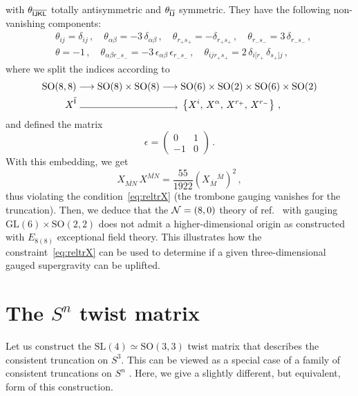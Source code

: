\documentclass[a4paper, 11pt]{article}
\numberwithin{equation}{section}
\newcommand{\ov}[1]{\overline{#1}}
\newcommand{\SL}[1]{\mathrm{SL}( #1 )}
\newcommand{\GL}[1]{\mathrm{GL}( #1 )}
\newcommand{\SO}[1]{\mathrm{SO}( #1 )}
\newcommand{\EE}{\ensuremath{E_{8(8)}}\xspace}
\newcommand{\+}{\oplus}
\newcommand{\fl}[1]{\ov{#1}}
\begin{document}
with $\theta_{\fl{\sf IJKL}}$ totally antisymmetric and $\theta_{\fl{\sf IJ}}$ symmetric. They have the following non-vanishing components:
\begin{align}
  & \theta_{ij}=\delta_{ij}\,,\quad \theta_{\alpha\beta}=-3\,\delta_{\alpha\beta}\,,\quad \theta_{r_{+}s_{+}}=-\delta_{r_{+}s_{+}}\,,\quad \theta_{r_{-}s_{-}}=3\,\delta_{r_{-}s_{-}}\,,\nonumber\\
  & \theta=-1\,,\quad \theta_{\alpha\beta r_{-}s_{-}} = -3\,\epsilon_{\alpha\beta}\,\epsilon_{r_{-}s_{-}}\,,\quad \theta_{ij r_{+}s_{+}} = 2\,\delta_{i[r_{+}}\,\delta_{s_{+}]j}\,,
\end{align}
where we split the indices according to
\begin{equation}
	\begin{aligned}
		\SO{8,8} & \longrightarrow \SO{8}\times\SO{8} \longrightarrow \SO{6}\times\SO{2}\times\SO{6}\times\SO{2} \\
		X^{\fl{\sf I}} & \ \tikz{\draw[arrows={->[scale=1.1]}] (0,0) -- (3.55
	,0);}\ \left\{X^{i},\,X^{\alpha},\,X^{r_{+}},\,X^{r_{-}}\right\}\,,
	\end{aligned}
\end{equation}
and defined the matrix
\begin{equation}
	 \epsilon = \begin{pmatrix}
                0 & 1\\
                -1 & 0
              \end{pmatrix}\,.
\end{equation}
With this embedding, we get
\begin{equation}
	X_{\ov{MN}}\,X^{\ov{MN}} = \frac{55}{1922}\left(X_{\ov M}{}^{\ov M}\right)^2\,,
\end{equation}
thus violating the condition~\eqref{eq:reltrX} (the trombone gauging vanishes for the truncation). Then, we deduce that the ${\cal N}=(8,0)$ theory of ref.~\cite{Deger:2019tem} with gauging $\GL{6} \times \SO{2,2}$ does not admit a higher-dimensional origin as constructed with \EE exceptional field theory. This illustrates how the constraint~\eqref{eq:reltrX} can be used to determine if a given three-dimensional gauged supergravity can be uplifted.

\section{The $S^n$ twist matrix} \label{s:SLn}
Let us construct the $\SL{4} \simeq \SO{3,3}$ twist matrix that describes the consistent truncation on $S^3$. This can be viewed as a special case of a family of consistent truncations on $S^n$ \cite{Lee:2014mla,Hohm:2014qga,Baguet:2015iou}. Here, we give a slightly different, but equivalent, form of this construction.
\end{document}
